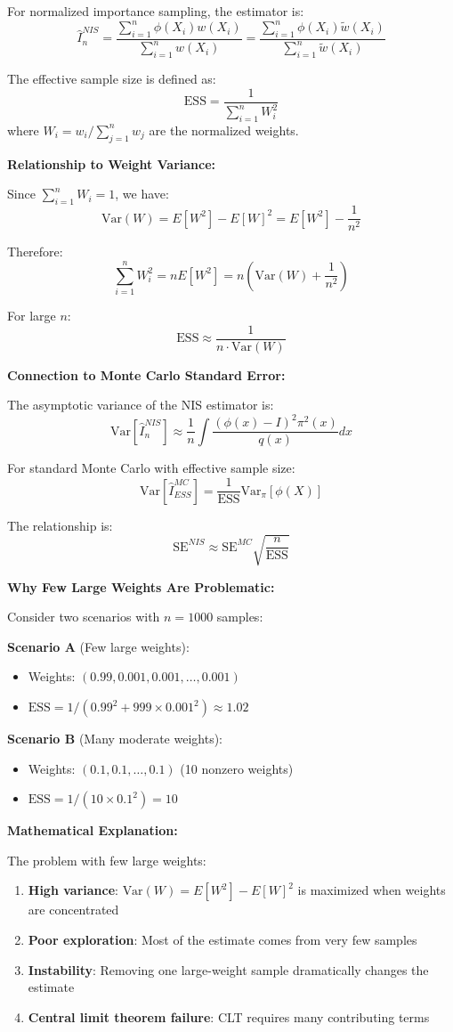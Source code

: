 \documentclass[11pt]{article}
\begin{document}
For normalized importance sampling, the estimator is:
$$\hat{I}^{NIS}_n = \frac{\sum_{i=1}^n \phi(X_i)w(X_i)}{\sum_{i=1}^n w(X_i)} = \frac{\sum_{i=1}^n \phi(X_i)\tilde{w}(X_i)}{\sum_{i=1}^n \tilde{w}(X_i)}$$

The effective sample size is defined as:
$$\text{ESS} = \frac{1}{\sum_{i=1}^n W_i^2}$$
where $W_i = w_i/\sum_{j=1}^n w_j$ are the normalized weights.

\textbf{Relationship to Weight Variance:}

Since $\sum_{i=1}^n W_i = 1$, we have:
$$\text{Var}(W) = E[W^2] - E[W]^2 = E[W^2] - \frac{1}{n^2}$$

Therefore:
$$\sum_{i=1}^n W_i^2 = nE[W^2] = n\left(\text{Var}(W) + \frac{1}{n^2}\right)$$

For large $n$:
$$\text{ESS} \approx \frac{1}{n \cdot \text{Var}(W)}$$

\textbf{Connection to Monte Carlo Standard Error:}

The asymptotic variance of the NIS estimator is:
$$\text{Var}[\hat{I}^{NIS}_n] \approx \frac{1}{n} \int \frac{(\phi(x) - I)^2\pi^2(x)}{q(x)}dx$$

For standard Monte Carlo with effective sample size:
$$\text{Var}[\hat{I}^{MC}_{ESS}] = \frac{1}{\text{ESS}} \text{Var}_\pi[\phi(X)]$$

The relationship is:
$$\text{SE}^{NIS} \approx \text{SE}^{MC} \sqrt{\frac{n}{\text{ESS}}}$$

\textbf{Why Few Large Weights Are Problematic:}

Consider two scenarios with $n=1000$ samples:

\textbf{Scenario A} (Few large weights):
\begin{itemize}
\item Weights: $(0.99, 0.001, 0.001, \ldots, 0.001)$
\item $\text{ESS} = 1/(0.99^2 + 999 \times 0.001^2) \approx 1.02$
\end{itemize}

\textbf{Scenario B} (Many moderate weights):
\begin{itemize}
\item Weights: $(0.1, 0.1, \ldots, 0.1)$ (10 nonzero weights)
\item $\text{ESS} = 1/(10 \times 0.1^2) = 10$
\end{itemize}

\textbf{Mathematical Explanation:}

The problem with few large weights:
\begin{enumerate}
\item \textbf{High variance}: $\text{Var}(W) = E[W^2] - E[W]^2$ is maximized when weights are concentrated
\item \textbf{Poor exploration}: Most of the estimate comes from very few samples
\item \textbf{Instability}: Removing one large-weight sample dramatically changes the estimate
\item \textbf{Central limit theorem failure}: CLT requires many contributing terms
\end{enumerate}
\end{document}
